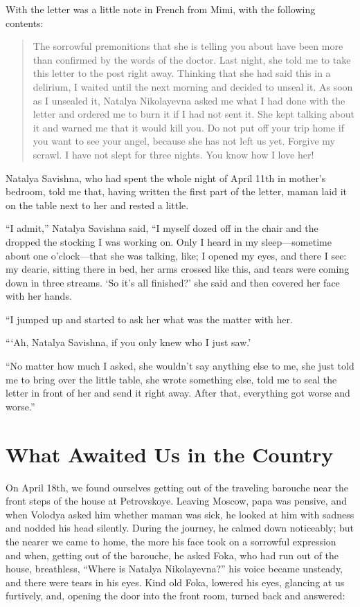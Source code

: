 With the letter was a little note in French from Mimi, with the following contents:

\begin{quotation}
The sorrowful premonitions that she is telling you about have been more than confirmed by the words of the doctor. Last night, she told me to take this letter to the post right away. Thinking that she had said this in a delirium, I waited until the next morning and decided to unseal it. As soon as I unsealed it, Natalya Nikolayevna asked me what I had done with the letter and ordered me to burn it if I had not sent it. She kept talking about it and warned me that it would kill you. Do not put off your trip home if you want to see your angel, because she has not left us yet. Forgive my scrawl. I have not slept for three nights. You know how I love her!
\end{quotation}

Natalya Savishna, who had spent the whole night of April 11th in mother's bedroom, told me that, having written the first part of the letter, maman laid it on the table next to her and rested a little.

``I admit,'' Natalya Savishna said, ``I myself dozed off in the chair and the dropped the stocking I was working on. Only I heard in my sleep---sometime about one o'clock---that she was talking, like; I opened my eyes, and there I see: my dearie, sitting there in bed, her arms crossed like this, and tears were coming down in three streams. `So it's all finished?' she said and then covered her face with her hands. %

``I jumped up and started to ask her what was the matter with her. %

```Ah, Natalya Savishna, if you only knew who I just saw.' %

``No matter how much I asked, she wouldn't say anything else to me, she just told me to bring over the little table, she wrote something else, told me to seal the letter in front of her and send it right away. After that, everything got worse and worse.'' %

\chapter{What Awaited Us in the Country} %

On April 18th, we found ourselves getting out of the traveling barouche near the front steps of the house at Petrovskoye. Leaving Moscow, papa was pensive, and when Volodya asked him whether maman was sick, he looked at him with sadness and nodded his head silently. During the journey, he calmed down noticeably; but the nearer we came to home, the more his face took on a sorrowful expression and when, getting out of the barouche, he asked Foka, who had run out of the house, breathless, ``Where is Natalya Nikolayevna?'' his voice became unsteady, and there were tears in his eyes. Kind old Foka, lowered his eyes, glancing at us furtively, and, opening the door into the front room, turned back and answered:

